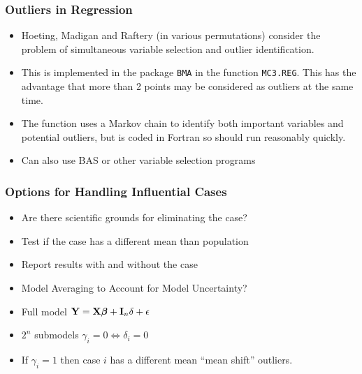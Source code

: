\documentclass[handout]{beamer}
\begin{document}
  \begin{frame} \frametitle{Outliers in Regression}
    \begin{itemize}
    \item Hoeting, Madigan and Raftery (in various permutations)
      consider the problem of simultaneous variable selection and
      outlier identification. \pause
\item   This is implemented in the package {\tt BMA} in the function
  {\tt MC3.REG}.
This has the advantage that more than 2 points may be considered as
outliers at the same time. \pause
\item The function uses a Markov chain to identify both important
  variables and potential outliers, but is coded in Fortran so should
  run reasonably quickly. \pause
\item Can also use BAS or other variable selection programs \pause
  \end{itemize}
  \end{frame}




\begin{frame} \frametitle{Options for Handling Influential Cases}
\begin{itemize}
\item Are there scientific grounds for eliminating the case? \pause
\item Test if the case  has a different mean than population \pause
\item Report results with and without the case \pause
\item Model Averaging to Account for Model Uncertainty?  \pause

\item Full model $\mathbf{Y} = \mathbf{X} \boldsymbol{\beta} + \mathbf{I}_n\delta + \epsilon$ \pause
\item $2^n$ submodels $\gamma_i = 0 \Leftrightarrow \delta_i = 0$
\item If $\gamma_i = 1$ then case $i$ has a different mean ``mean
  shift'' outliers.
\end{itemize}

\end{frame}
\end{document}
